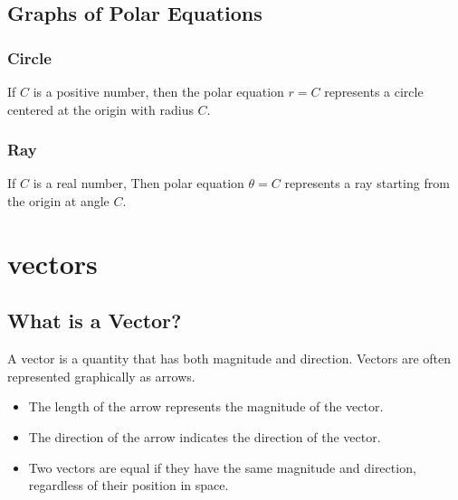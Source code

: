 \subsection{Graphs of Polar Equations}
\subsubsection{Circle}
If \(C\) is a positive number, then the polar equation \(r = C\) represents a circle centered at the origin with radius \(C\).
\subsubsection{Ray}
If \(C\) is a real number, Then polar equation \(\theta = C\) represents a ray starting from the origin at angle \(C\).

\section{vectors}
\subsection{What is a Vector?}
A vector is a quantity that has both magnitude and direction. Vectors are often represented graphically as arrows.
\begin{itemize}
    \item The length of the arrow represents the magnitude of the vector.
    \item The direction of the arrow indicates the direction of the vector.
    \item Two vectors are equal if they have the same magnitude and direction, regardless of their position in space.
\end{itemize}

